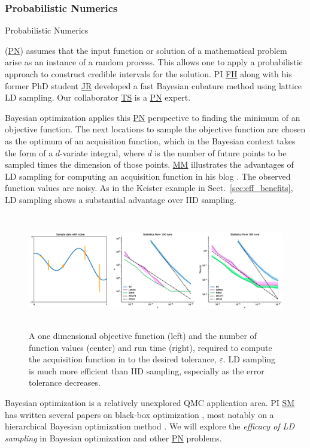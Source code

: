 \documentclass[11pt]{NSFamsart}
\newcommand{\FH}{\hyperlink{FHlink}{FH}\xspace}
\newcommand{\SM}{\hyperlink{SMlink}{SM}\xspace}
\newcommand{\MM}{\hyperlink{MMlink}{MM}\xspace}
\newcommand{\TS}{\hyperlink{TSlink}{TS}\xspace}
\newcommand{\JR}{\hyperlink{JRlink}{JR}\xspace}
\newcommand{\PN}{\hyperlink{PNlink}{PN}\xspace}
\begin{document}
\subsubsection{Probabilistic Numerics}
\hypertarget{PNlink}{Probabilistic Numerics} (\PN) assumes that the input function or solution of a mathematical problem arise as an instance of a random process.  This allows one to apply a probabilistic approach to construct credible intervals for the solution. PI \FH along with his former PhD student \JR developed a fast Bayesian cubature method \cite{RatHic19a} using lattice LD sampling.  Our collaborator \TS is a \PN expert.

Bayesian optimization applies this \PN perspective to finding the minimum of an objective function.  The next locations to sample the objective function are chosen as the optimum of an acquisition function, which in the Bayesian context takes the form of a $d$-variate integral, where $d$ is the number of future points to be sampled times the dimension of those points.  \MM illustrates the advantages of LD sampling for computing an acquisition function in his blog \cite[qEI with QMCPy]{QMCBlog}.  The observed function values are noisy.  As in the Keister example in Sect.\ \ref{sec:eff_benefits}, LD sampling shows a substantial advantage over IID sampling.

\begin{figure}[h]
	\centering
	\includegraphics[height = 5cm]{ProgramsImages/qEI_cost_comp_time.eps}
	\caption{A one dimensional objective function (left) and the number of function values (center) and run time (right), required to compute the acquisition function in \cite[qEI with QMCPy]{QMCBlog} to the desired tolerance, $\varepsilon$.  LD sampling is much more efficient than IID sampling, especially as the error tolerance decreases.}
	\label{fig:qei}
\end{figure}

Bayesian optimization is a relatively unexplored QMC application area. PI \SM has written several papers on black-box optimization \cite{mak2019analysis,chen2019hierarchical}, most notably on a hierarchical Bayesian optimization method \cite{chen2019hierarchical}. We will explore the \emph{efficacy of LD sampling} in Bayesian optimization and other \PN problems.
\end{document}
